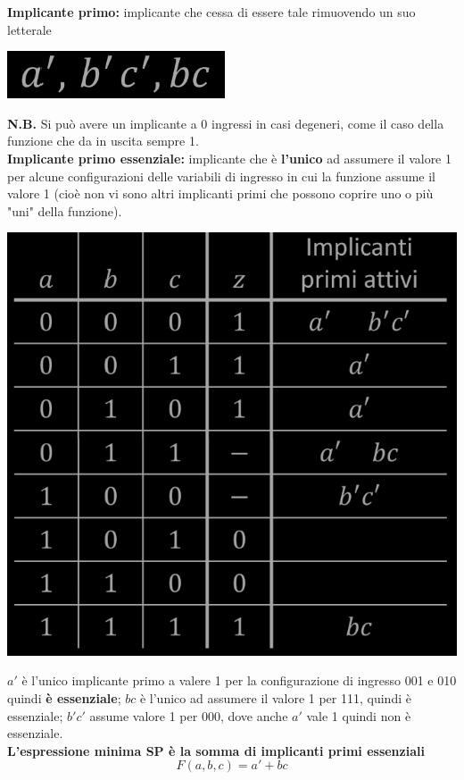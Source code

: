\documentclass{article}
\begin{document}
\textbf{Implicante primo:} implicante che cessa di essere tale rimuovendo un suo letterale
\begin{center}
    \includegraphics[scale=0.45]{imp1Z.png}
\end{center}
\textbf{N.B.} Si può avere un implicante a 0 ingressi in casi degeneri, come il caso della funzione che da in uscita sempre 1.
\vspace{0.3cm}\\
\textbf{Implicante primo essenziale:} implicante che è \textbf{l'unico} ad assumere il valore 1 per alcune configurazioni delle variabili di ingresso in cui la funzione assume il valore 1 (cioè non vi sono altri implicanti primi che possono coprire uno o più "uni" della funzione).
\begin{center}
    \includegraphics[scale=0.45]{imp1att.png}
\end{center}
$a'$ è l'unico implicante primo a valere 1 per la configurazione di ingresso 001 e 010 quindi \textbf{è essenziale}; $bc$ è l'unico ad assumere il valore 1 per 111, quindi è essenziale; $b'c'$ assume valore 1 per 000, dove anche $a'$ vale 1 quindi non è essenziale.
\vspace{0.2cm}\\
\textbf{L'espressione minima SP è la somma di implicanti primi essenziali}
$$ F(a, b,c) = a'+bc $$
\end{document}
